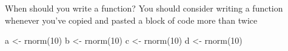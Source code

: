 \documentclass[
  ignorenonframetext,
]{beamer}
\newenvironment{Shaded}{\begin{snugshade}}{\end{snugshade}}
\newcommand{\DecValTok}[1]{\textcolor[rgb]{0.68,0.00,0.00}{#1}}
\newcommand{\FunctionTok}[1]{\textcolor[rgb]{0.28,0.35,0.67}{#1}}
\newcommand{\NormalTok}[1]{\textcolor[rgb]{0.00,0.23,0.31}{#1}}
\newcommand{\OtherTok}[1]{\textcolor[rgb]{0.00,0.23,0.31}{#1}}
\begin{document}
\begin{frame}[fragile]
\begin{block}{When should you write a function?}
\protect\hypertarget{when-should-you-write-a-function}{}
You should consider writing a function whenever you've copied and pasted
a block of code more than twice

\begin{Shaded}
\begin{Highlighting}[]
\NormalTok{a }\OtherTok{\textless{}{-}} \FunctionTok{rnorm}\NormalTok{(}\DecValTok{10}\NormalTok{)}
\NormalTok{b }\OtherTok{\textless{}{-}} \FunctionTok{rnorm}\NormalTok{(}\DecValTok{10}\NormalTok{)}
\NormalTok{c }\OtherTok{\textless{}{-}} \FunctionTok{rnorm}\NormalTok{(}\DecValTok{10}\NormalTok{)}
\NormalTok{d }\OtherTok{\textless{}{-}} \FunctionTok{rnorm}\NormalTok{(}\DecValTok{10}\NormalTok{)}
\end{Highlighting}
\end{Shaded}
\end{block}
\end{frame}
\end{document}

